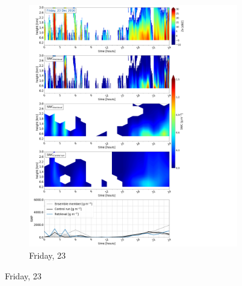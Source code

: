     \begin{figure}\ContinuedFloat
   		\centering
		\begin{subfigure}[b]{0.8\textwidth}
			\includegraphics[trim={0.5cm 0.5cm 17.5cm .5cm},clip,width=\textwidth]{./fig_SWC/20161223}
			\caption{Friday, \SI{23}{\dec}}\label{fig:SWC23}
		\end{subfigure}
	\end{figure}

